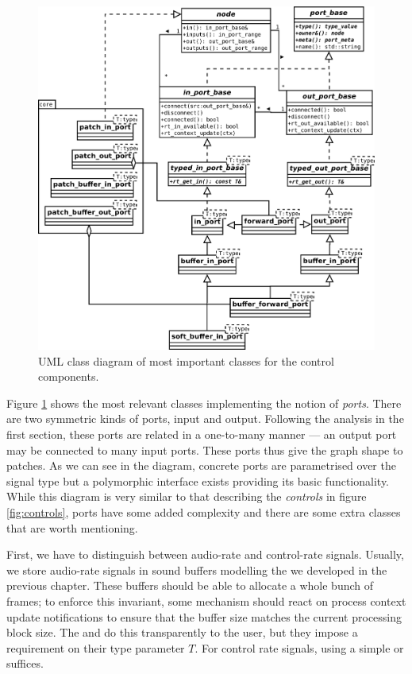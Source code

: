 \begin{figure}[t]
  \centering
  \includegraphics[width=\textwidth]{pic/graph-port.pdf}
  \caption{UML class diagram of most important classes for the
  control components.}
\label{fig:ports}
\end{figure}

Figure \ref{fig:ports} shows the most relevant classes implementing
the notion of \emph{ports}. There are two symmetric kinds
of ports, input and output. Following the analysis in the first
section, these ports are related in a one-to-many manner --- an output
port may be connected to many input ports. These ports thus give the
graph shape to patches. As we can see in the diagram, concrete ports
are parametrised over the signal type but a polymorphic interface
exists providing its basic functionality. While this diagram is very
similar to that describing the \emph{controls} in figure
\ref{fig:controls}, ports have some added complexity and there are
some extra classes that are worth mentioning.

First, we have to distinguish between audio-rate and control-rate
signals. Usually, we store audio-rate signals in sound buffers
modelling the  we developed in the previous
chapter. These buffers should be able to allocate a whole bunch of
 frames; to enforce this invariant, some mechanism
should react on process context update notifications to ensure that
the buffer size matches the current processing block size. The
 and  do this
transparently to the user, but they impose a 
requirement on their type parameter $T$. For control rate signals,
using a simple  or  suffices.

